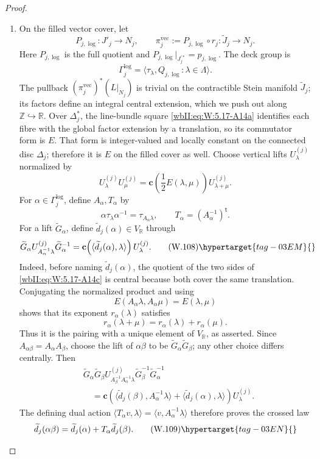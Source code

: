 \begin{proof}
\begin{enumerate}[label=\arabic*.,leftmargin=*]
\item On the filled vector cover, let
\[
 P_{j,\log}:J'_j\longrightarrow N_j,\qquad
 \pi_j^{\mathrm{vec}}:=P_{j,\log}\circ r_j:
 \widetilde J_j\longrightarrow N_j .
\]
Here \(P_{j,\log}\) is the full quotient and
\(P_{j,\log}|_{J_j^{\prime *}}=p_{j,\log}\).
The deck group is
\[
 \Gamma_j^{\log}
 =\langle\tau_\lambda,Q_{j,\log}:\lambda\in\Lambda\rangle.
\]
The pullback \((\pi_j^{\mathrm{vec}})^*(L|_{N_j})\) is trivial on the
contractible Stein manifold \(\widetilde J_j\); its factors define an
integral central extension, which we push out along
\(\mathbb Z\hookrightarrow\mathbb R\).  Over \(\Delta_j^*\), the
line-bundle square \eqref{wbII:eq:W:5.17-A14a} identifies each fibre with the global factor
extension by a translation, so its commutator form is \(E\).  That form is
integer-valued and locally constant on the connected disc \(\Delta_j\);
therefore it is \(E\) on the filled cover as well.  Choose vertical lifts
\(U_\lambda^{(j)}\) normalized by
\[
 U_\lambda^{(j)}U_\mu^{(j)}
 =\mathbf c\!\left(\frac12E(\lambda,\mu)\right)
  U_{\lambda+\mu}^{(j)}.
\]
For \(\alpha\in\Gamma_j^{\log}\), define \(A_\alpha,T_\alpha\) by
\[
 \alpha\tau_\lambda\alpha^{-1}=\tau_{A_\alpha\lambda},\qquad
 T_\alpha=(A_\alpha^{-1})^{\mathsf t}.
\]
For a lift \(\widetilde G_\alpha\), define
\(\widetilde d_j(\alpha)\in V_{\mathbb R}\) through
\[
 \widetilde G_\alpha U_{A_\alpha^{-1}\lambda}^{(j)}
 \widetilde G_\alpha^{-1}
 =\mathbf c\!\left(\langle\widetilde d_j(\alpha),\lambda\rangle\right)
  U_\lambda^{(j)}.
\tag{W.108}\hypertarget{tag-03EM}{}\label{wbII:eq:W:5.17-A14c}
\]
Indeed, before naming \(\widetilde d_j(\alpha)\), the quotient of the two
sides of \eqref{wbII:eq:W:5.17-A14c} is central because both cover the same translation.
Conjugating the normalized product and using
\[
 E(A_\alpha\lambda,A_\alpha\mu)=E(\lambda,\mu)
\]
shows that its exponent \(r_\alpha(\lambda)\) satisfies
\[
 r_\alpha(\lambda+\mu)=r_\alpha(\lambda)+r_\alpha(\mu).
\]
Thus it is the pairing with a unique element of \(V_{\mathbb R}\), as
asserted.  Since \(A_{\alpha\beta}=A_\alpha A_\beta\), choose the lift of
\(\alpha\beta\) to be \(\widetilde G_\alpha\widetilde G_\beta\); any other
choice differs centrally.  Then
\[
\begin{aligned}
 &\widetilde G_\alpha\widetilde G_\beta
 U_{A_\beta^{-1}A_\alpha^{-1}\lambda}^{(j)}
 \widetilde G_\beta^{-1}\widetilde G_\alpha^{-1}\\
 &\quad=
 \mathbf c\!\left(
  \langle\widetilde d_j(\beta),A_\alpha^{-1}\lambda\rangle
  +\langle\widetilde d_j(\alpha),\lambda\rangle\right)
 U_\lambda^{(j)}.
\end{aligned}
\]
The defining dual action
\(\langle T_\alpha v,\lambda\rangle
=\langle v,A_\alpha^{-1}\lambda\rangle\) therefore proves the crossed law
\[
 \widetilde d_j(\alpha\beta)
 =\widetilde d_j(\alpha)+T_\alpha\widetilde d_j(\beta).
\tag{W.109}\hypertarget{tag-03EN}{}\label{wbII:eq:W:5.17-A14d}
\]


\end{enumerate}
\end{proof}
